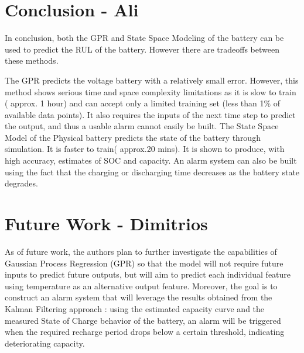 \section{Conclusion - Ali}
In conclusion, both the GPR and State Space Modeling of the battery can be used to predict the RUL of the battery. However there are tradeoffs between these methods. 

The GPR predicts the voltage battery with a relatively small error. However, this method shows serious time and space complexity limitations as it is slow to train ( approx. 1 hour) and can accept only a limited training set (less than 1\% of available data points). It also requires the inputs of the next time step to predict the output, and thus a usable alarm cannot easily be built.
The State Space Model of the Physical battery predicts the state of the battery through simulation. It is faster to train( approx.20 mins). It is shown to produce, with high accuracy, estimates of SOC and capacity. An alarm system can also be built using the fact that the charging or discharging time decreases as the battery state degrades.

\section{Future Work - Dimitrios}
As of future work, the authors plan to further investigate the capabilities of Gaussian Process Regression (GPR) so that the model will not require future inputs to predict future outputs, but will aim to predict each individual feature using temperature as an alternative output feature. Moreover, the goal is to construct an alarm system that will leverage the results obtained from the Kalman Filtering approach : using the estimated capacity curve and the measured State of Charge behavior of the battery, an alarm will be triggered when the required recharge period drops below a certain threshold, indicating deteriorating capacity.

 
 

